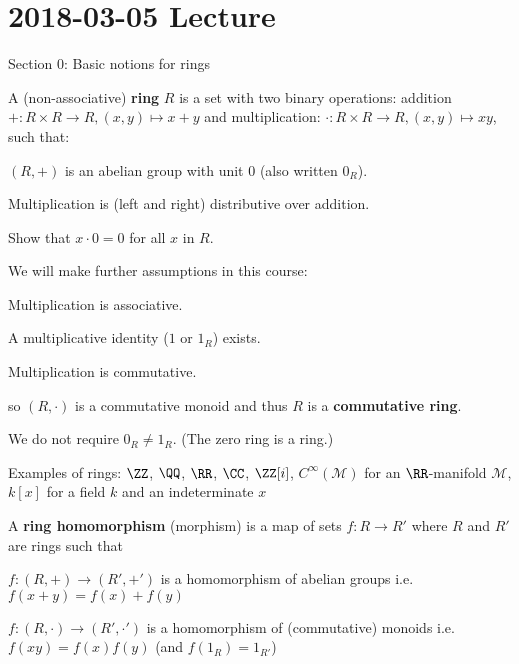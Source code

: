 \section{2018-03-05 Lecture}

Section 0: Basic notions for rings

\begin{defn}
	A (non-associative) \textbf{ring} $R$ is a set with two binary operations: addition $+: R \times R \to R, (x,y) \mapsto x+y$ and multiplication: $\cdot: R \times R \to R, (x,y) \mapsto xy$, such that:
	\begin{enum}
		\item $(R,+)$ is an abelian group with unit $0$ (also written $0_R$).
		\item Multiplication is (left and right) distributive over addition.
	\end{enum}
\end{defn}

\begin{exer}
	Show that $x \cdot 0 = 0$ for all $x$ in $R$.
\end{exer}

\begin{rmk}
	We will make further assumptions in this course:
	\begin{enum}
		\item Multiplication is associative.
		\item A multiplicative identity ($1$ or $1_R$) exists.
		\item Multiplication is commutative.
	\end{enum}
	so $(R,\cdot)$ is a commutative monoid and thus $R$ is a \textbf{commutative ring}.
\end{rmk}

\begin{rmk}
	We do not require $0_R \neq 1_R$.
	(The zero ring is a ring.)
\end{rmk}

\begin{exam}
	Examples of rings: $\ZZ$, $\QQ$, $\RR$, $\CC$, $\ZZ[i]$, $C^\infty(\mathcal{M})$ for an $\RR$-manifold $\mathcal{M}$, $k[x]$ for a field $k$ and an indeterminate $x$
\end{exam}

\begin{defn}
	A \textbf{ring homomorphism} (morphism) is a map of sets $f: R \to R'$ where $R$ and $R'$ are rings such that
	\begin{enum}
		\item $f: (R,+) \to (R',+')$ is a homomorphism of abelian groups i.e.\@ $f(x+y)=f(x)+f(y)$
		\item $f: (R,\cdot) \to (R',\cdot')$ is a homomorphism of (commutative) monoids i.e.\@ $f(xy)=f(x)f(y)$ (and $f(1_R)=1_{R'}$)
	\end{enum}
\end{defn}

